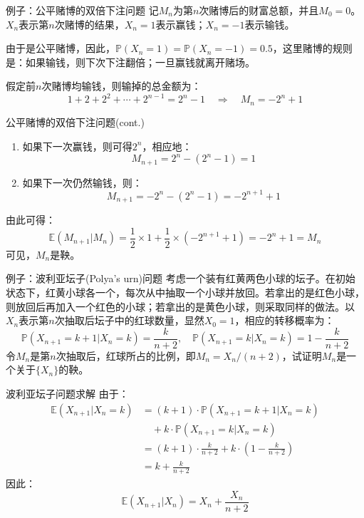 \documentclass[t]{beamer}
\renewcommand{\Pr}{\mathbb{P}}
\newcommand{\E}{\mathbb{E}}
\begin{document}
\begin{frame}{例子：公平赌博的双倍下注问题}
	记$M_n$为第$n$次赌博后的财富总额，并且$M_0=0$。$X_n$表示第$n$次赌博的结果，$X_n=1$表示赢钱；$X_n=-1$表示输钱。
	
	由于是公平赌博，因此，$\Pr(X_n=1)=\Pr(X_n=-1)=0.5$，这里赌博的规则是：如果输钱，则下次下注翻倍；一旦赢钱就离开赌场。
	
	假定前$n$次赌博均输钱，则输掉的总金额为：
  \[1+2+2^2+\cdots +2^{n-1}=2^n-1\quad \Rightarrow\quad M_n=-2^n+1 \]
\end{frame}

\begin{frame}{公平赌博的双倍下注问题(cont.)}
	\begin{enumerate}
		\item 如果下一次赢钱，则可得$2^n$，相应地：$$M_{n+1}=2^n-(2^n-1)=1$$
		\item 如果下一次仍然输钱，则：$$M_{n+1}=-2^n-(2^n-1)=-2^{n+1}+1$$
	\end{enumerate}
	由此可得：
	\begin{equation*}
	\E(M_{n+1}|M_n)=\frac{1}{2}\times 1+\frac{1}{2}\times \left( -2^{n+1}+1\right) =-2^n+1=M_n
	\end{equation*}
	可见，$M_n$是鞅。
\end{frame}






      \begin{frame}{例子：波利亚坛子(Polya's urn)问题}
        考虑一个装有红黄两色小球的坛子。在初始状态下，红黄小球各一个，每次从中抽取一个小球并放回。若拿出的是红色小球，则放回后再加入一个红色的小球；若拿出的是黄色小球，则采取同样的做法。以$X_n$表示第$n$次抽取后坛子中的红球数量，显然$X_0=1$，相应的转移概率为：
      \[\Pr(X_{n+1}=k+1|X_{n}=k)=\frac{k}{n+2},\quad \Pr(X_{n+1}=k|X_{n}=k)=1-\frac{k}{n+2} \]
      令$M_n$是第$n$次抽取后，红球所占的比例，即$M_n=X_n/(n+2)$，试证明$M_n$是一个关于$\{X_n\}$的鞅。
      \end{frame}
      
\begin{frame}{波利亚坛子问题求解}
  由于：
\[\begin{split}
\E(X_{n+1}|X_n=k)&=(k+1)\cdot \Pr(X_{n+1}=k+1|X_{n}=k)\\
&\quad + k\cdot \Pr(X_{n+1}=k|X_{n}=k) \\
&=(k+1)\cdot \frac{k}{n+2}+ k\cdot \left(1-\frac{k}{n+2} \right) \\
&=k+\frac{k}{n+2}
\end{split} \]
因此：\[\E(X_{n+1}|X_n)=X_n+\frac{X_n}{n+2} \]
\end{frame}
      
\end{document}

